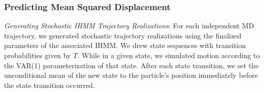 \documentclass[journal=jpcbfk,manuscript=article]{achemso}
\begin{document}
  
  \subsubsection*{Predicting Mean Squared Displacement}\label{method:realizations}

  
  \textit{Generating Stochastic IHMM Trajectory Realizations}: For each independent 
  MD trajectory, we generated stochastic trajectory realizations using the finalized 
  parameters of the associated IHMM. We drew state sequences with transition probabilities
  given by $T$. While in a given state, we simulated motion according to the VAR(1) 
  parameterization of that state. After each state transition, we set the unconditional
  mean of the new state to the particle's position immediately before the state 
  transition occurred.
  
\end{document}
